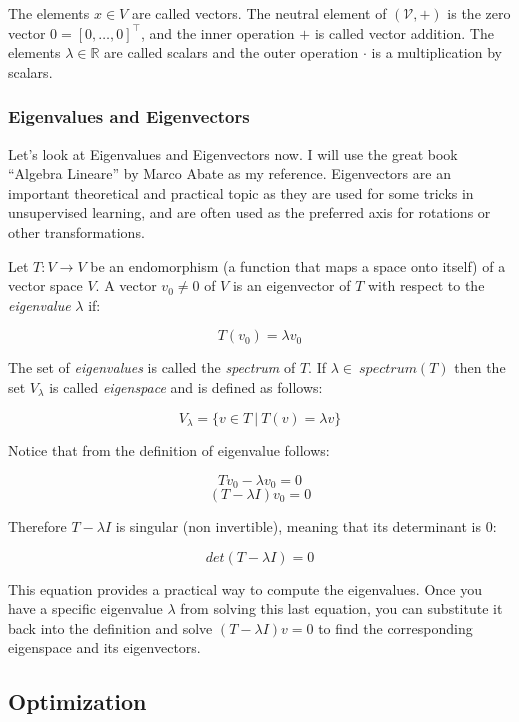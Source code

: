 \documentclass{article}
\begin{document}
The elements \(x \in V\) are called vectors. The neutral element of
\((\mathcal{V},
+)\) is the zero vector \(0 = [0,\ldots,0]^\top\), and the inner
operation \(+\) is called vector addition. The elements
\(\lambda \in \mathbb{R}\) are called scalars and the outer operation
\(\cdot\) is a multiplication by scalars.

\subsubsection{Eigenvalues and
Eigenvectors}\label{eigenvalues-and-eigenvectors}

Let's look at Eigenvalues and Eigenvectors now. I will use the great
book ``Algebra Lineare'' by Marco Abate as my reference. Eigenvectors
are an important theoretical and practical topic as they are used for
some tricks in unsupervised learning, and are often used as the
preferred axis for rotations or other transformations.

Let \(T: V\rightarrow V\) be an endomorphism (a function that maps a
space onto itself) of a vector space \(V\). A vector \(v_0 \ne 0\) of
\(V\) is an eigenvector of \(T\) with respect to the \emph{eigenvalue}
\(\lambda\) if:

\[T(v_0)=\lambda v_0\]

The set of \emph{eigenvalues} is called the \emph{spectrum} of \(T\). If
\(\lambda \in \
spectrum(T)\) then the set \(V_{\lambda}\) is called \emph{eigenspace}
and is defined as follows:

\[V_{\lambda} = \{ v\in T\ |\ T(v)=\lambda v \}\]

Notice that from the definition of eigenvalue follows:

\[Tv_0 - \lambda v_0 = 0\] \[(T - \lambda I)v_0 = 0\]

Therefore \(T-\lambda I\) is singular (non invertible), meaning that its
determinant is 0:

\[det(T-\lambda I)=0\]

This equation provides a practical way to compute the eigenvalues. Once
you have a specific eigenvalue \(\lambda\) from solving this last
equation, you can substitute it back into the definition and solve
\((T - \lambda I)v = 0\) to find the corresponding eigenspace and its
eigenvectors.

\subsection{Optimization}\label{optimization}
\end{document}
